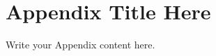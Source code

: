 \documentclass[main.tex]{subfiles}
\begin{document}
\chapter{Appendix Title Here} %

\label{AppendixX} %

Write your Appendix content here.
\end{document}
